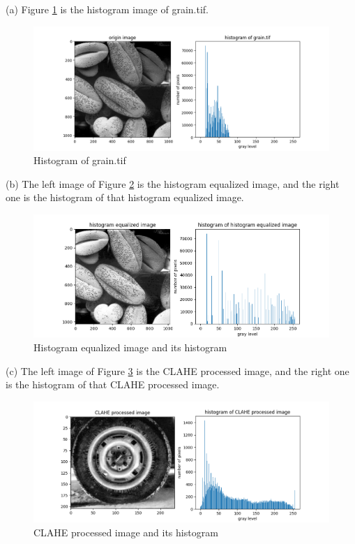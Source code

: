\problem{}
(a) Figure \ref{fig:p1a} is the histogram image of grain.tif.\\

\begin{figure}[htbp]
    \centering
	\includegraphics[width=\textwidth]{../images/p1/p1a.png}
    \caption{Histogram of grain.tif}
    \label{fig:p1a}
\end{figure}

(b) The left image of Figure \ref{fig:p1b} is the histogram equalized image, and the right one is 
the histogram of that histogram equalized image.\\

\begin{figure}[htbp]
    \centering
	\includegraphics[width=\textwidth]{../images/p1/p1b.png}
    \caption{Histogram equalized image and its histogram}
    \label{fig:p1b}
\end{figure}

(c) The left image of Figure \ref{fig:p1c} is the CLAHE processed image, and the right one is 
the histogram of that CLAHE processed image.\\

\begin{figure}[htbp]
    \centering
	\includegraphics[width=\textwidth]{../images/p1/p1c.png}
    \caption{CLAHE processed image and its histogram}
    \label{fig:p1c}
\end{figure}

\newpage